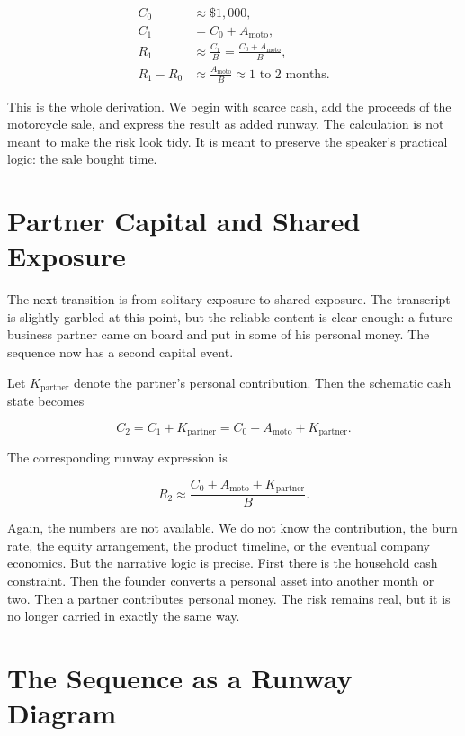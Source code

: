 \begin{align}
C_0 &\approx \$1{,}000, \\
C_1 &= C_0 + A_{\mathrm{moto}}, \\
R_1 &\approx \frac{C_1}{B}
     = \frac{C_0 + A_{\mathrm{moto}}}{B}, \\
R_1 - R_0 &\approx \frac{A_{\mathrm{moto}}}{B}
          \approx 1\text{ to }2 \text{ months}.
\end{align}

This is the whole derivation. We begin with scarce cash, add the proceeds of the motorcycle sale, and express the result as added runway. The calculation is not meant to make the risk look tidy. It is meant to preserve the speaker's practical logic: the sale bought time.

\section{Partner Capital and Shared Exposure}

The next transition is from solitary exposure to shared exposure. The transcript is slightly garbled at this point, but the reliable content is clear enough: a future business partner came on board and put in some of his personal money. The sequence now has a second capital event.

Let \(K_{\mathrm{partner}}\) denote the partner's personal contribution. Then the schematic cash state becomes

\begin{equation}
C_2 = C_1 + K_{\mathrm{partner}}
    = C_0 + A_{\mathrm{moto}} + K_{\mathrm{partner}} .
\end{equation}

The corresponding runway expression is

\begin{equation}
R_2 \approx \frac{C_0 + A_{\mathrm{moto}} + K_{\mathrm{partner}}}{B}.
\end{equation}

Again, the numbers are not available. We do not know the contribution, the burn rate, the equity arrangement, the product timeline, or the eventual company economics. But the narrative logic is precise. First there is the household cash constraint. Then the founder converts a personal asset into another month or two. Then a partner contributes personal money. The risk remains real, but it is no longer carried in exactly the same way.

\section{The Sequence as a Runway Diagram}

